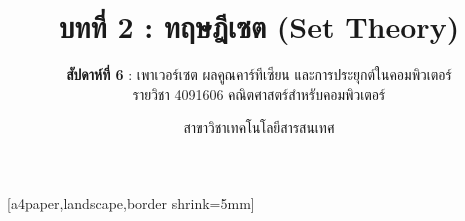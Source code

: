 \def\HANDOUTMODE{}

\usepackage{pgfpages}
[a4paper,landscape,border shrink=5mm]
\renewcommand{\footchaptertitle}{บทที่ 2 ทฤษฎีเซต (สัปดาห์ที่ 6) — Handout}

\title{\textbf{บทที่ 2 : ทฤษฎีเซต (Set Theory)}}
\subtitle{\textbf{สัปดาห์ที่ 6} : เพาเวอร์เซต ผลคูณคาร์ทีเซียน และการประยุกต์ในคอมพิวเตอร์ \\ รายวิชา 4091606 คณิตศาสตร์สำหรับคอมพิวเตอร์}
\author{สาขาวิชาเทคโนโลยีสารสนเทศ}
\date{}




